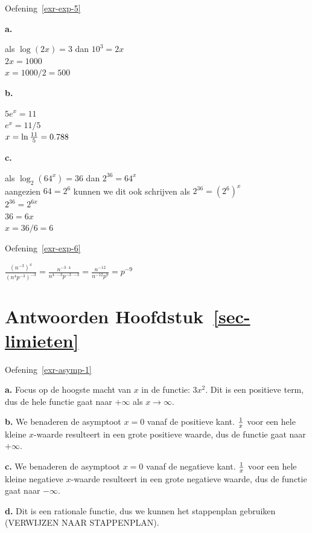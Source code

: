 \documentclass[
  a4paper,
]{scrbook}
\theoremstyle{definition}
\theoremstyle{remark}
\begin{document}
Oefening~\ref{exr-exp-5}

\textbf{a.}

als \(\log (2x) = 3\) dan \(10^3 = 2x\)\\
\(2x = 1000\)\\
\(x = 1000/2 = 500\)

\textbf{b.}

\(5e^x=11\)\\
\(e^x=11/5\)\\
\(x = \ln{11 \over 5} = 0.788\)

\textbf{c.}

als \(\log_2(64^x)=36\) dan \(2^{36} = 64^x\)\\
aangezien \(64=2^6\) kunnen we dit ook schrijven als
\(2^{36} = (2^6)^x\)\\
\(2^{36} = 2^{6x}\)\\
\(36 = 6x\)\\
\(x = 36/6 = 6\)

Oefening~\ref{exr-exp-6}

\(\frac{(n^{-3})^4}{(n^{4}p^{-3})^{-3}}=\frac{n^{-3\cdot4}}{n^{4\cdot-3}p^{-3\cdot-3}}=\frac{n^{-12}}{n^{-12}p^{9}}=p^{-9}\)

\hypertarget{antwoorden-sec-limieten}{%
\section*{\texorpdfstring{Antwoorden
Hoofdstuk~\ref{sec-limieten}}{Antwoorden Hoofdstuk~}}\label{antwoorden-sec-limieten}}


Oefening~\ref{exr-asymp-1}

\textbf{a.} Focus op de hoogste macht van \(x\) in de functie: \(3x^2\).
Dit is een positieve term, dus de hele functie gaat naar \(+ \infty\)
als \(x\to\infty\).

\textbf{b.} We benaderen de asymptoot \(x=0\) vanaf de positieve kant.
\(1\over x\) voor een hele kleine \(x\)-waarde resulteert in een grote
positieve waarde, dus de functie gaat naar \(+ \infty\).

\textbf{c.} We benaderen de asymptoot \(x=0\) vanaf de negatieve kant.
\(1\over x\) voor een hele kleine negatieve \(x\)-waarde resulteert in
een grote negatieve waarde, dus de functie gaat naar \(- \infty\).

\textbf{d.} Dit is een rationale functie, dus we kunnen het stappenplan
gebruiken (VERWIJZEN NAAR STAPPENPLAN).
\end{document}
